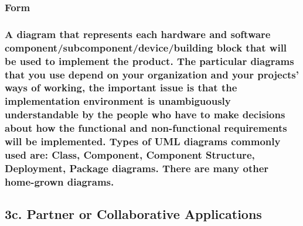 \documentclass[
]{article}
\begin{document}
\hypertarget{form-11}{%
\subsubsection{Form}\label{form-11}}

\hypertarget{a-diagram-that-represents-each-hardware-and-software-componentsubcomponentdevicebuilding-block-that-will-be-used-to-implement-the-product.-the-particular-diagrams-that-you-use-depend-on-your-organization-and-your-projects-ways-of-working-the-important-issue-is-that-the-implementation-environment-is-unambiguously-understandable-by-the-people-who-have-to-make-decisions-about-how-the-functional-and-non-functional-requirements-will-be-implemented.-types-of-uml-diagrams-commonly-used-are-class-component-component-structure-deployment-package-diagrams.-there-are-many-other-home-grown-diagrams.}{%
\subsubsection{A diagram that represents each hardware and software
component/subcomponent/device/building block that will be used to
implement the product. The particular diagrams that you use depend on
your organization and your projects' ways of working, the important
issue is that the implementation environment is unambiguously
understandable by the people who have to make decisions about how the
functional and non-functional requirements will be implemented. Types of
UML diagrams commonly used are: Class, Component, Component Structure,
Deployment, Package diagrams. There are many other home-grown
diagrams.}\label{a-diagram-that-represents-each-hardware-and-software-componentsubcomponentdevicebuilding-block-that-will-be-used-to-implement-the-product.-the-particular-diagrams-that-you-use-depend-on-your-organization-and-your-projects-ways-of-working-the-important-issue-is-that-the-implementation-environment-is-unambiguously-understandable-by-the-people-who-have-to-make-decisions-about-how-the-functional-and-non-functional-requirements-will-be-implemented.-types-of-uml-diagrams-commonly-used-are-class-component-component-structure-deployment-package-diagrams.-there-are-many-other-home-grown-diagrams.}}

\hypertarget{c.-partner-or-collaborative-applications}{%
\subsection{3c. Partner or Collaborative
Applications}\label{c.-partner-or-collaborative-applications}}
\end{document}
